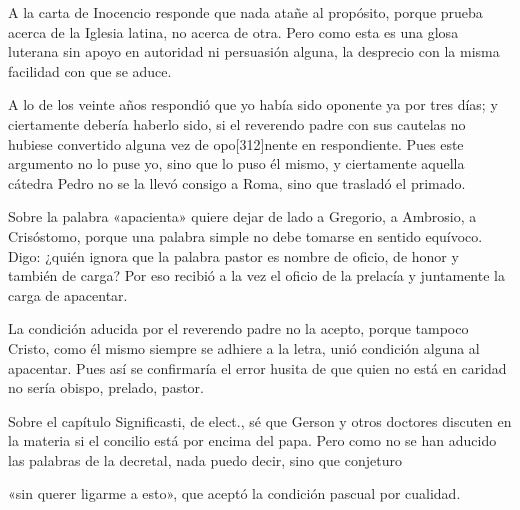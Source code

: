 A la carta de Inocencio responde que nada atañe al propósito, porque prueba acerca de la Iglesia latina, no acerca de otra. Pero como esta es una glosa luterana sin apoyo en autoridad ni persuasión alguna, la desprecio con la misma facilidad con que se aduce.

A lo de los veinte años respondió que yo había sido oponente ya por tres días; y ciertamente debería haberlo sido, si el reverendo padre con sus cautelas no hubiese convertido alguna vez de opo[312]nente en respondiente. Pues este argumento no lo puse yo, sino que lo puso él mismo, y ciertamente aquella cátedra Pedro no se la llevó consigo a Roma, sino que trasladó el primado.

Sobre la palabra «apacienta» quiere dejar de lado a Gregorio, a Ambrosio, a Crisóstomo, porque una palabra simple no debe tomarse en sentido equívoco. Digo: ¿quién ignora que la palabra pastor es nombre de oficio, de honor y también de carga? Por eso recibió a la vez el oficio de la prelacía y juntamente la carga de apacentar.

La condición aducida por el reverendo padre no la acepto, porque tampoco Cristo, como él mismo siempre se adhiere a la letra, unió condición alguna al apacentar. Pues así se confirmaría el error husita de que quien no está en caridad no sería obispo, prelado, pastor.

Sobre el capítulo Significasti, de elect., sé que Gerson y otros doctores discuten en la materia si el concilio está por encima del papa. Pero como no se han aducido las palabras de la decretal, nada puedo decir, sino que conjeturo

«sin querer ligarme a esto», que aceptó la condición pascual por cualidad.

